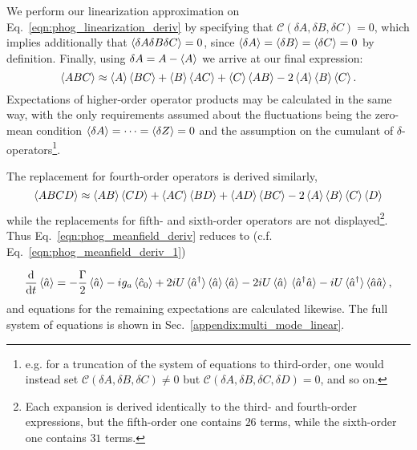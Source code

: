 \noindent We perform our linearization approximation on Eq.~\ref{eqn:phog_linearization_deriv} by specifying that $\mathcal{C}\left(\delta A, \delta B, \delta C \right) = 0$, which implies additionally that $\ev{\delta A \delta B \delta C} = 0$, since $\ev{\delta A} = \ev{\delta B} = \ev{\delta C} = 0$ by definition. Finally, using $\delta A = A - \ev{A}$ we arrive at our final expression:
\begin{equation}\label{eqn:linearization_3}
\ev{A B C} \approx \ev{A} \ev{B C} + \ev{B} \ev{A C} + \ev{C} \ev{A B} - 2 \ev{A} \ev{B} \ev{C}.
\end{equation}
Expectations of higher-order operator products may be calculated in the same way, with the only requirements assumed about the fluctuations being the zero-mean condition $\ev{\delta A} = \dots = \ev{\delta Z} = 0$ and the assumption on the cumulant of $\delta$-operators\footnote{e.g. for a truncation of the system of equations to third-order, one would instead set $\mathcal{C}\left(\delta A, \delta B, \delta C\right) \ne 0$ but $\mathcal{C}\left(\delta A, \delta B, \delta C , \delta D\right) = 0$, and so on.}.

The replacement for fourth-order operators is derived similarly,
\begin{equation}
\ev{A B C D} \approx \ev{A B}\ev{C D} + \ev{A C}\ev{B D} + \ev{A D}\ev{B C} - 2 \ev{A}\ev{B}\ev{C}\ev{D}
\end{equation}
while the replacements for fifth- and sixth-order operators are not displayed\footnote{Each expansion is derived identically to the third- and fourth-order expressions, but the fifth-order one contains $26$ terms, while the sixth-order one contains $31$ terms.}. Thus Eq.~\ref{eqn:phog_meanfield_deriv} reduces to (c.f. Eq.~\ref{eqn:phog_meanfield_deriv_1})

\begin{equation}
\ddt \ev{\hat{a}} = - \frac{\Gamma}{2} \ev{\hat{a}} - i g_a \ev{\hat{c}_0} + 2 i U \ev*{\hat{a}^\dagger}\ev{\hat{a}}\ev{\hat{a}} - 2 i U \ev{\hat{a}}\ev*{\hat{a}^\dagger \hat{a}} - i U \ev*{\hat{a}^\dagger} \ev{\hat{a} \hat{a}},
\end{equation}
and equations for the remaining expectations are calculated likewise. The full system of equations is shown in Sec.~\ref{appendix:multi_mode_linear}.




